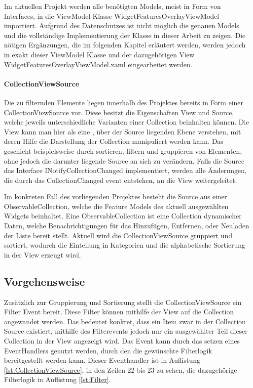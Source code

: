 Im aktuellen Projekt werden alle benötigten Models, meist in Form von Interfaces, in die ViewModel Klasse WidgetFeaturesOverlayViewModel importiert.
Aufgrund des Datenschutzes ist nicht möglich die genauen Models und die vollständige Implementierung der Klasse in dieser Arbeit zu zeigen.
Die nötigen Ergänzungen, die im folgenden Kapitel erläutert werden, werden jedoch in exakt dieser ViewModel Klasse und der dazugehörigen View WidgetFeaturesOverlayViewModel.xaml eingearbeitet werden.

\paragraph{CollectionViewSource}
Die zu filternden Elemente liegen innerhalb des Projektes bereits in Form einer CollectionViewSource vor.
Diese besitzt die Eigenschaften View und Source, welche jeweils unterschiedliche Varianten einer Collection beinhalten können.
Die View kann man hier als eine , über der Source liegenden Ebene verstehen, mit deren Hilfe die Darstellung der Collection manipuliert werden kann.
Das geschieht beispielsweise durch sortieren, filtern und gruppieren von Elementen, ohne jedoch die darunter liegende Source an sich zu verändern.
Falls die Source das Interface INotifyCollectionChanged implementiert, werden alle Änderungen, die durch das CollectionChanged event entstehen, an die View weitergeleitet.\cite{dotnetbot.}

Im konkreten Fall des vorliegenden Projektes besteht die Source aus einer ObservableCollection, welche die Feature Models des aktuell ausgewählten Widgets beinhaltet.
Eine ObservableCollection ist eine Collection dynamischer Daten, welche Benachrichtigungen für das Hinzufügen, Entfernen, oder Neuladen der Liste bereit stellt.
\cite{dotnetbot.c}
Aktuell wird die CollectionViewSource gruppiert und sortiert, wodurch die Einteilung in Kategorien und die alphabetische Sortierung in der View erzeugt wird.

\subsection {Vorgehensweise}
Zusätzlich zur Gruppierung und Sortierung stellt die CollectionViewSource ein Filter Event bereit.
Diese Filter können mithilfe der View auf die Collection angewandet werden. 
Das bedeutet konkret, dass ein Item zwar in der Collection Source existiert, mithilfe des Filterevents jedoch nur ein ausgewählter Teil dieser Collection in der View angezeigt wird.\cite{dotnetbot.b}
Das Event kann durch das setzen eines EventHandlers genutzt werden, durch den die gewünschte Filterlogik bereitgestellt werden kann.
Dieser Eventhandler ist in Auflistung \ref{lst:CollectionViewSource}, in den Zeilen 22 bis 23 zu sehen, die dazugehörige Filterlogik in Auflistung \ref{lst:Filter}.

